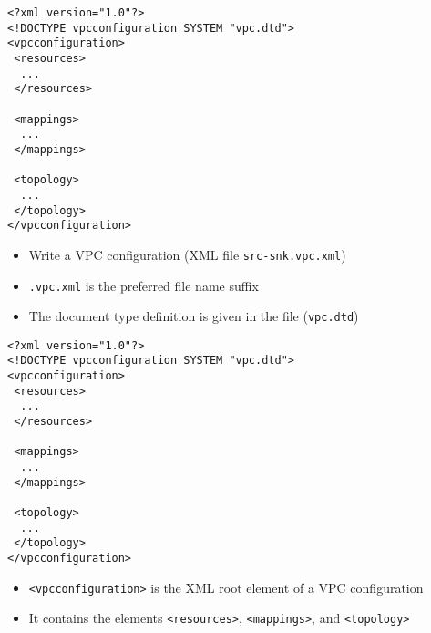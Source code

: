 \lstset{language=XML}
\begin{frame}[fragile=singleslide]
\begin{lstlisting}
<?xml version="1.0"?>
<!DOCTYPE vpcconfiguration SYSTEM "vpc.dtd">
<vpcconfiguration>
 <resources>
  ...
 </resources>

 <mappings>
  ...
 </mappings>

 <topology>
  ...
 </topology>
</vpcconfiguration>
\end{lstlisting}
\begin{itemize}
\item Write a VPC configuration (XML file \lstinline!src-snk.vpc.xml!)
\item \lstinline!.vpc.xml! is the preferred file name suffix
\item The document type definition is given in the file (\lstinline!vpc.dtd!)
\end{itemize}
\end{frame}


\begin{frame}[fragile=singleslide]
\begin{lstlisting}
<?xml version="1.0"?>
<!DOCTYPE vpcconfiguration SYSTEM "vpc.dtd">
<vpcconfiguration>
 <resources>
  ...
 </resources>

 <mappings>
  ...
 </mappings>

 <topology>
  ...
 </topology>
</vpcconfiguration>
\end{lstlisting}
\begin{itemize}
\item \lstinline!<vpcconfiguration>! is the XML root element of a VPC configuration
\item It contains the elements \lstinline!<resources>!, \lstinline!<mappings>!, and \lstinline!<topology>!
\end{itemize}
\end{frame}


